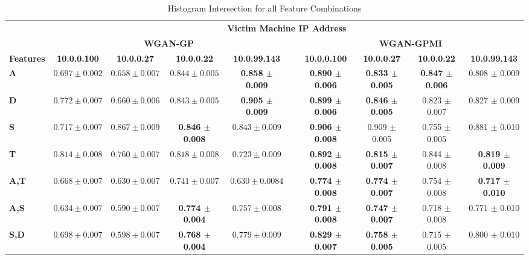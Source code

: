 \begin{table}[!htbp]
	\caption{Histogram Intersection for all Feature Combinations}
	\label{tab:inter}
	\centering
	\begin{adjustbox}{angle=90}
	\begin{tabular}{l|c|c|c|c|c|c|c|c|c|}
		\multicolumn{1}{c|}{} & \multicolumn{9}{c|}{\textbf{Victim Machine IP Address}} \\
		\multicolumn{1}{c|}{} & \multicolumn{4}{c|}{\textbf{WGAN-GP}} &  & \multicolumn{4}{c|}{\textbf{WGAN-GPMI}} \\
		\multicolumn{1}{c|}{\textbf{Features}} & \textbf{10.0.0.100} & \textbf{10.0.0.27} & \textbf{10.0.0.22} & \textbf{10.0.99.143} & \textbf{} & \textbf{10.0.0.100} & \textbf{10.0.0.27} & \textbf{10.0.0.22} & \textbf{10.0.99.143} \\ \hline
		\textbf{A} & $0.697 \pm 0.002$ & $0.658 \pm 0.007$ & $0.844 \pm 0.005$ & \textbf{0.858 $\pm$ 0.009} &   						& \textbf{0.890 $\pm$ 0.006} & \textbf{0.833 $\pm$ 0.005} & \textbf{0.847 $\pm$ 0.006} & 0.808 $\pm$ 0.009 \\
		\textbf{D} & $0.772 \pm 0.007$ & $0.660 \pm 0.006$ & $0.843 \pm 0.005$ & \textbf{0.905 $\pm$ 0.009} &  					  	& \textbf{0.899 $\pm$ 0.006} & \textbf{0.846 $\pm$ 0.005} & 0.823 $\pm$ 0.007 & 0.827 $\pm$ 0.009 \\
		\textbf{S} & $0.717 \pm 0.007$ & $0.867 \pm 0.009$ & \textbf{0.846 $\pm$ 0.008} & $0.843 \pm 0.009$ &  					  	& \textbf{0.906 $\pm$ 0.008} & 0.909 $\pm$ 0.005 & 0.755 $\pm$ 0.005 & 0.881 $\pm$ 0.010 \\
		\textbf{T} & $0.814 \pm 0.008$ & $0.760 \pm 0.007$ & $0.818 \pm 0.008$ & $0.723 \pm 0.009$ &  										  & \textbf{0.892 $\pm$ 0.008} & \textbf{0.815 $\pm$ 0.007} & 0.844 $\pm$ 0.008 & \textbf{0.819 $\pm$ 0.009} \\ \hline
		\textbf{A,T} & $0.668 \pm 0.007$ & $0.630 \pm 0.007$ & $0.741 \pm 0.007$ & $0.630 \pm 0.0084$ &   						        & \textbf{0.774 $\pm$ 0.008} & \textbf{0.774 $\pm$ 0.007} & 0.754 $\pm$ 0.008 & \textbf{0.717 $\pm$ 0.010} \\
		\textbf{A,S} & $0.634 \pm 0.007$ & $0.590 \pm 0.007$ & \textbf{0.774 $\pm$ 0.004} & $0.757 \pm 0.008$ &  						& \textbf{0.791 $\pm$ 0.008} & \textbf{0.747 $\pm$ 0.007} & 0.718 $\pm$ 0.008 & 0.771 $\pm$ 0.010 \\
		\textbf{S,D} & $0.698 \pm 0.007$ & $0.598 \pm 0.007$ & \textbf{0.768 $\pm$ 0.004} & $0.779 \pm 0.009$ &  						& \textbf{0.829 $\pm$ 0.007} & \textbf{0.758 $\pm$ 0.005} & 0.715 $\pm$ 0.005 & 0.800 $\pm$ 0.010 \\

\end{tabular}
\end{adjustbox}
\end{table}
